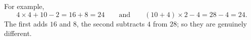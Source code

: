 For example,
\[\boxed{4\times4+10-2=16+8=24}\qquad\text{and}\qquad\boxed{(10+4)\times2-4=28-4=24}.\]
The first adds $16$ and $8$, the second subtracts $4$ from $28$; so they are genuinely different.
